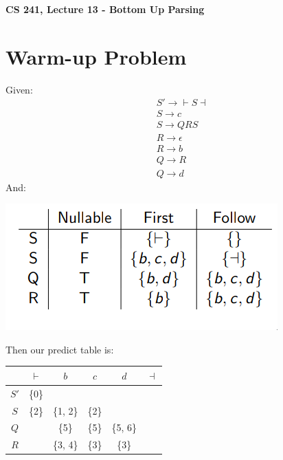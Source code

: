 \documentclass[12pt]{article}
\author{Clement Tsang}
\begin{document}
\begin{center}
\Large\textbf{CS 241, Lecture 13 - Bottom Up Parsing}
\end{center}

\section{Warm-up Problem}
Given:
\begin{align}
    &S' \rightarrow \vdash S \dashv \\
    &S \rightarrow c \\
    &S \rightarrow QRS \\
    &R \rightarrow \epsilon \\
    &R \rightarrow b \\
    &Q \rightarrow R \\
    &Q \rightarrow d
\end{align}
And:\\
\begin{center}
    \includegraphics[scale=0.5]{warmup_null.png}
\end{center}
Then our predict table is:\\
\begin{center}
    \begin{tabular}{c||ccccc}
        & $\vdash$ & $b$ & $c$ & $d$ & $\dashv$ \\
        \hline
        $S'$ & \{0\} \\
        $S$ & \{2\} & \{1, 2\} & \{2\} \\
        $Q$ & & \{5\} & \{5\} & \{5, 6\} \\
        $R$ & & \{3, 4\} & \{3\} & \{3\}
    \end{tabular}
\end{center}
\end{document}
